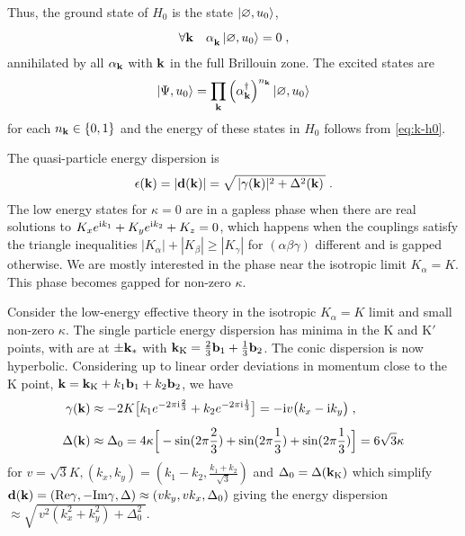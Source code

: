 Thus, the ground state of $H_0$ is the state $\ket{\varnothing, u_0 }$,
\begin{equation}
    \forall \mb{k} \quad \alpha_{\mb k}^\pd \ket{\varnothing, u_0 } = 0 \; ,
\end{equation}
annihilated by all $\alpha_{\mathbf{k}}$ with $\mathbf{k}$ in the full Brillouin zone. %
The excited states are
\begin{equation}
    \ket{\Psi, u_0 } = \prod_{\mathbf k}  \left(\alpha_{\mathbf k}^\dagger \right)^{n_\mathbf{k}} \ket{\varnothing, u_0 }
\end{equation}
for each $n_{\mathbf k} \in \{0,1\}$ and the energy of these states in $H_0$ follows from \eqref{eq:k-h0}.


The quasi-particle energy dispersion is
\begin{equation}
    \epsilon(\mathbf{k})
    = |\mathbf{d}(\mathbf{k})|
    = \sqrt{ \, |\gamma(\mathbf k)|^2 + \Delta^2(\mathbf k) \, } \; .
\end{equation}
The low energy states for $\kappa=0$ are in a gapless phase when there are real solutions to $K_x e^{\mathrm{i} k_1}+K_y e^{\mathrm{i} k_2}+K_z = 0$, which happens when the couplings satisfy the triangle inequalities $|K_\alpha|+|K_\beta|\geq |K_\gamma|$ for $(\alpha\beta\gamma)$ different and is gapped otherwise. %
We are mostly interested in the phase near the isotropic limit $K_\alpha=K$.
This phase becomes gapped for non-zero $\kappa$.




Consider the low-energy effective theory in the isotropic  $K_\alpha=K$ limit and small non-zero $\kappa$.
The single particle energy dispersion has minima in the $\mathrm{K}$ and $\mathrm{K}'$ points, with are at $\pm\mathbf{k}_{\ast}$ with $\mathbf{k}_{\mathrm{K}}=\frac{2}{3}\mathbf{b}_1+\frac{1}{3}\mathbf{b}_2$. The conic dispersion is now hyperbolic.
Considering up to linear order deviations in momentum close to the $\mathrm K$ point,  $\mathbf{k}=\mathbf{k}_{\mathrm{K}} + k_1 \mathbf{b}_1+ k_2 \mathbf{b}_2 $,
we have
\begin{equation}
    \begin{split}
        \gamma(\mathbf{k}) &\approx
        -2 K\big[ k_1 e^{-2\pi \mathrm{i} \frac{2}{3}}+k_2 e^{-2\pi \mathrm{i} \frac{1}{3}}\big]
        =-\mathrm{i} v \big(   k_x -  \mathrm{i} k_y \big) \; , \\[5pt]
        \Delta(\mathbf{k})
        &\approx \Delta_0
        =  4 \kappa \Big[ -\sin(2\pi \frac{2}{3})+ \sin(2\pi \frac{1}{3})+\sin(2\pi \frac{1}{3}) \Big]
        =6\sqrt{3} \kappa
    \end{split}
\end{equation}
for $v  =\sqrt{3} K, (k_x,k_y)=(k_1-k_2,\frac{k_1+k_2}{\sqrt{3}})$ and $\Delta_0=\Delta(\mathbf{k}_{\mathrm{K}}) $
which simplify $\mathbf{d}(\mathbf{k}) = (\mathrm{Re}\gamma,-\mathrm{Im}\gamma,\Delta)\approx ( v k_y,  v k_x,\Delta_0)$ giving the energy dispersion $\approx \sqrt{ \, v^2 (k_x^2+k_y^2) + \Delta^2_0 \; }$.


